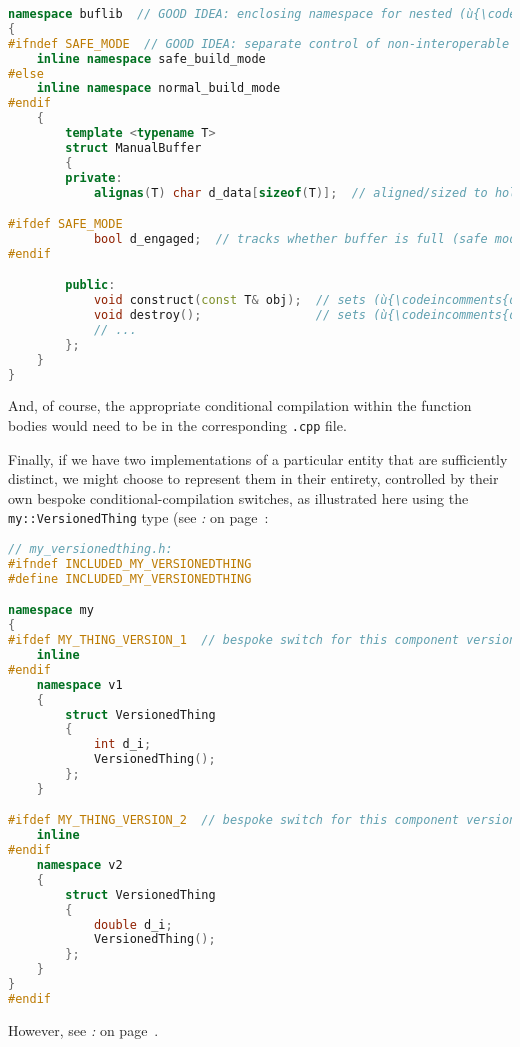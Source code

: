 \begin{lstlisting}[language=C++]
namespace buflib  // GOOD IDEA: enclosing namespace for nested (ù{\codeincomments{inline}}ù) namespace
{
#ifndef SAFE_MODE  // GOOD IDEA: separate control of non-interoperable versions
    inline namespace safe_build_mode
#else
    inline namespace normal_build_mode
#endif
    {
        template <typename T>
        struct ManualBuffer
        {
        private:
            alignas(T) char d_data[sizeof(T)];  // aligned/sized to hold a (ù{\codeincomments{T}}ù)

#ifdef SAFE_MODE
            bool d_engaged;  // tracks whether buffer is full (safe mode only)
#endif

        public:
            void construct(const T& obj);  // sets (ù{\codeincomments{d\_engaged}}ù) (safe mode only)
            void destroy();                // sets (ù{\codeincomments{d\_engaged}}ù) (safe mode only)
            // ...
        };
    }
}
\end{lstlisting}

\noindent And, of course, the appropriate conditional compilation within the
function bodies would need to be in the corresponding \texttt{.cpp}
file.

Finally, if we have two implementations of a particular entity that are
sufficiently distinct, we might choose to represent them in their
entirety, controlled by their own bespoke conditional-compilation
switches, as illustrated here using the \texttt{my::VersionedThing} type
(see \textit{: } on page~\pageref{link-safe-abi-versioning}:

\begin{lstlisting}[language=C++]
// my_versionedthing.h:
#ifndef INCLUDED_MY_VERSIONEDTHING
#define INCLUDED_MY_VERSIONEDTHING

namespace my
{
#ifdef MY_THING_VERSION_1  // bespoke switch for this component version
    inline
#endif
    namespace v1
    {
        struct VersionedThing
        {
            int d_i;
            VersionedThing();
        };
    }

#ifdef MY_THING_VERSION_2  // bespoke switch for this component version
    inline
#endif
    namespace v2
    {
        struct VersionedThing
        {
            double d_i;
            VersionedThing();
        };
    }
}
#endif
\end{lstlisting}

\noindent However, see \textit{: } on page~\pageref{inline-namespace-based-versioning-doesn’t-scale}.

